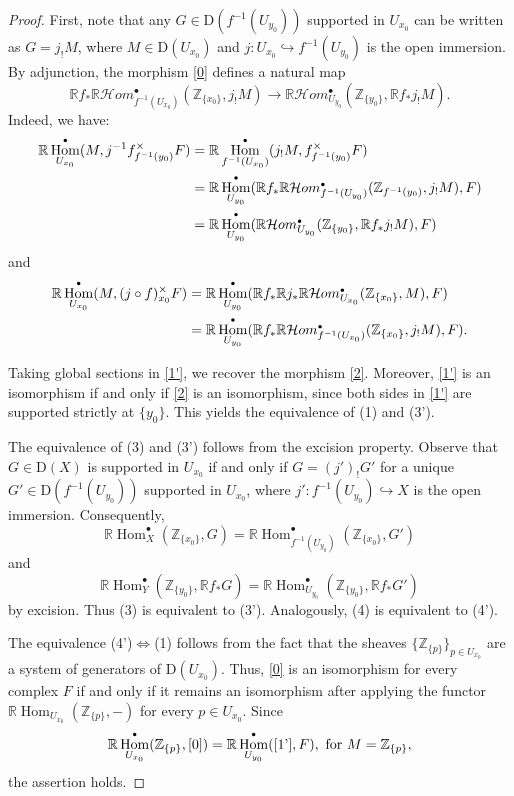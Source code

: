 \documentclass[amssymb,amscd,11pt,20pt]{amsart}
\newcommand{\ZZ}{{\mathbb Z}}
\newcommand{\RR}{\mathbb R}
\newcommand{\0}{\mathbf 0}
\DeclareMathOperator{\Hom}{{Hom}}
\newcommand{\pun}{{\scriptscriptstyle \bullet}}
\newcommand{\HHom}{\mathcal{H}om}
\theoremstyle{plain}
\numberwithin{equation}{thm}
\begin{document}
\begin{proof} First, note that any $G\in \mathrm{D}(f^{-1}(U_{y_0}))$ supported in $U_{x_0}$ can be written as $G=j_!M$, where $M\in \mathrm{D}(U_{x_0})$ and $j\colon U_{x_0}\hookrightarrow f^{-1}(U_{y_0})$ is the open immersion. By adjunction, the morphism \eqref{0} defines a natural map
\begin{equation}\label{1'} \RR f_* \RR\HHom_{f^{-1}(U_{x_0})}^\pun(\ZZ_{\{x_0\}}, j_!M)\to \RR\HHom_{ U_{y_0}}^\pun(\ZZ_{\{y_0\}}, \RR f_* j_!M).\end{equation}  Indeed, we have:
\[\aligned \RR\Hom_{U_{x_0}}^\pun(M, j^{-1} f^\times_{f^{-1}(y_0)}F)
&= \RR\Hom_{f^{-1}(U_{x_0})}^\pun(j_!M,   f^\times_{f^{-1}(y_0)}F) \\
&= \RR\Hom_{U_{y_0}}^\pun(\RR f_*\RR\HHom_{f^{-1}(U_{y_0})}^\pun (\ZZ_{f^{-1}(y_0)}, j_!M), F)\\
&= \RR\Hom_{U_{y_0}}^\pun (\RR\HHom_{U_{y_0}}^\pun(\ZZ_{\{y_0\}}, \RR f_* j_!M), F)
\endaligned\] and
\[ \aligned \RR\Hom_{U_{x_0}}^\pun(M, (j\circ f)^\times_{x_0} F) 
&= \RR\Hom_{U_{y_0}}^\pun (\RR f_*\RR j_*\RR\HHom_{U_{x_0}}^\pun(\ZZ_{\{x_0\}}, M),F)\\
&= \RR\Hom_{U_{y_0}}^\pun (\RR f_* \RR\HHom_{f^{-1}(U_{x_0})}^\pun(\ZZ_{\{x_0\}}, j_!M),F).
\endaligned\] 

Taking global sections in \eqref{1'}, we recover the morphism \eqref{2}. Moreover, \eqref{1'} is an isomorphism if and only if \eqref{2} is an isomorphism, since both sides in \eqref{1'} are supported strictly at $\{y_0\}$. This yields the equivalence of (1) and (3').

The equivalence of (3) and (3') follows from the excision property. Observe that $G\in \mathrm{D}(X)$ is supported in $U_{x_0}$ if and only if $G=(j')_!G'$ for a unique $G'\in \mathrm{D}(f^{-1}(U_{y_0}))$ supported in $U_{x_0}$, where $j'\colon f^{-1}(U_{y_0})\hookrightarrow X$ is the open immersion. Consequently,
\[ \RR\Hom_{X}^\pun(\ZZ_{\{x_0\}}, G)= \RR\Hom_{f^{-1}(U_{y_0})}^\pun(\ZZ_{\{x_0\}}, G')\] and
\[ \RR\Hom_{Y}^\pun(\ZZ_{\{y_0\}},\RR f_* G)= \RR\Hom_{U_{y_0}}^\pun(\ZZ_{\{y_0\}},\RR f_* G')\] by excision. Thus (3) is equivalent to (3'). Analogously, (4) is equivalent to (4').

The equivalence (4')$\Leftrightarrow $(1) follows from the fact that the sheaves  $\{\ZZ_{\{p\}}\}_{p\in U_{x_0}}$ are a system of generators of $\mathrm{D}(U_{x_0})$. Thus, \eqref{0} is an isomorphism for every complex $F$ if and only if it remains an isomorphism after applying the functor  $\RR\Hom_{U_{x_0}}(\ZZ_{\{p\}},-)$ for every $p\in U_{x_0}$. Since
\[\RR\Hom_{U_{x_0}}^\pun(\ZZ_{\{p\}},\eqref{0})=\RR\Hom_{U_{y_0}}^\pun(\eqref{1'},F), \text{ for }M=\ZZ_{\{p\}},\] the assertion holds.



\end{proof}
\end{document}
